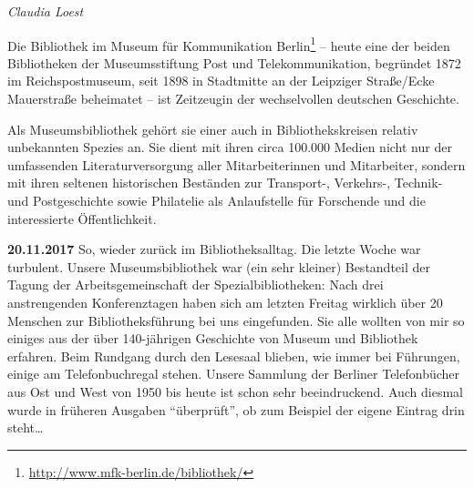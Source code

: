 \documentclass[a4paper,
fontsize=11pt,
oneside,
numbers=noperiodatend,
parskip=half-,
bibliography=totoc,
final
]{scrartcl}
\begin{document}
\emph{Claudia Loest}

Die Bibliothek im Museum für Kommunikation Berlin\footnote{\url{http://www.mfk-berlin.de/bibliothek/}}
-- heute eine der beiden Bibliotheken der Museumsstiftung Post und
Telekommunikation, begründet 1872 im Reichspostmuseum, seit 1898 in
Stadtmitte an der Leipziger Straße/Ecke Mauerstraße beheimatet -- ist
Zeitzeugin der wechselvollen deutschen Geschichte.

Als Museumsbibliothek gehört sie einer auch in Bibliothekskreisen
relativ unbekannten Spezies an. Sie dient mit ihren circa 100.000 Medien
nicht nur der umfassenden Literaturversorgung aller Mitarbeiterinnen und
Mitarbeiter, sondern mit ihren seltenen historischen Beständen zur
Transport-, Verkehrs-, Technik- und Postgeschichte sowie Philatelie als
Anlaufstelle für Forschende und die interessierte Öffentlichkeit.

\textbf{20.11.2017} So, wieder zurück im Bibliotheksalltag. Die letzte
Woche war turbulent. Unsere Museumsbibliothek war (ein sehr kleiner)
Bestandteil der Tagung der Arbeitsgemeinschaft der Spezialbibliotheken:
Nach drei anstrengenden Konferenztagen haben sich am letzten Freitag
wirklich über 20 Menschen zur Bibliotheksführung bei uns eingefunden.
Sie alle wollten von mir so einiges aus der über 140-jährigen Geschichte
von Museum und Bibliothek erfahren. Beim Rundgang durch den Lesesaal
blieben, wie immer bei Führungen, einige am Telefonbuchregal stehen.
Unsere Sammlung der Berliner Telefonbücher aus Ost und West von 1950 bis
heute ist schon sehr beeindruckend. Auch diesmal wurde in früheren
Ausgaben \enquote{überprüft}, ob zum Beispiel der eigene Eintrag drin
steht\ldots{}
\end{document}
